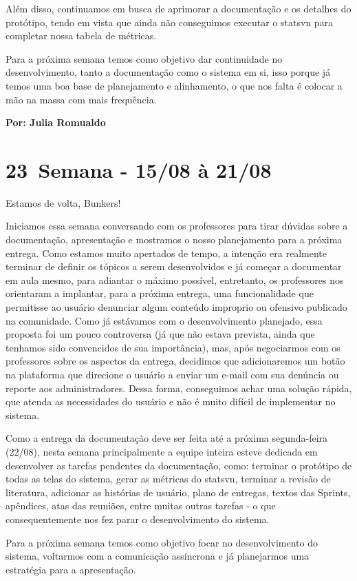 Além disso, continuamos em busca de aprimorar a documentação e os detalhes do protótipo, tendo em vista que ainda não conseguimos executar o \gls{statsvn} para completar nossa tabela de métricas.

Para a próxima semana temos como objetivo dar continuidade no desenvolvimento, tanto a documentação como o sistema em si, isso porque já temos uma boa base de planejamento e alinhamento, o que nos falta é colocar a mão na massa com mais frequência.

\textbf{Por: Julia Romualdo}

\section{23\textordfeminine \, Semana - 15/08 à 21/08}
Estamos de volta, Bunkers!

Iniciamos essa semana conversando com os professores para tirar dúvidas sobre a documentação, apresentação e mostramos o nosso planejamento para a próxima entrega. Como estamos muito apertados de tempo, a intenção era realmente terminar de definir os tópicos a serem desenvolvidos e já começar a documentar em aula mesmo, para adiantar o máximo possível, entretanto, os professores nos orientaram a implantar, para a próxima entrega, uma funcionalidade que permitisse ao usuário denunciar algum conteúdo improprio ou ofensivo publicado na comunidade. Como já estávamos com o desenvolvimento planejado, essa proposta foi um pouco controversa (já que não estava prevista, ainda que tenhamos sido convencidos de sua importância), mas, após negociarmos com os professores sobre os aspectos da entrega, decidimos que adicionaremos um botão na plataforma que direcione o usuário a enviar um e-mail com sua denúncia ou reporte aos administradores. Dessa forma, conseguimos achar uma solução rápida, que atenda as necessidades do usuário e não é muito difícil de implementar no sistema.

Como a entrega da documentação deve ser feita até a próxima segunda-feira (22/08), nesta semana principalmente a equipe inteira esteve dedicada em desenvolver as tarefas pendentes da documentação, como: terminar o protótipo de todas as telas do sistema, gerar as métricas do \gls{statsvn}, terminar a revisão de literatura, adicionar as histórias de usuário, plano de entregas, textos das \glspl{Sprint}, apêndices, atas das reuniões, entre muitas outras tarefas - o que consequentemente nos fez parar o desenvolvimento do sistema.

Para a próxima semana temos como objetivo focar no desenvolvimento do sistema, voltarmos com a comunicação assíncrona e já planejarmos uma estratégia para a apresentação.

